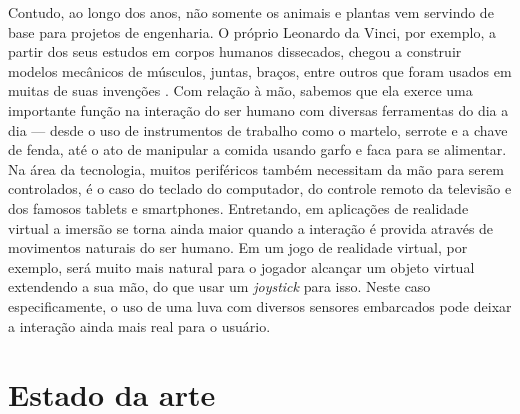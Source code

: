 \documentclass[
	12pt,				%
	openright,			%
	oneside,			%
	a4paper,			%
	english,			%
	brazil				%
	]{abntex2}
\begin{document}
		Contudo, ao longo dos anos, não somente os animais e plantas vem servindo de base para projetos de engenharia. O próprio Leonardo da Vinci, por exemplo, a partir dos seus estudos em corpos humanos dissecados, chegou a construir modelos mecânicos de músculos, juntas, braços, entre outros que foram usados em muitas de suas invenções \cite{rosheim2006leonardo}. Com relação à mão, sabemos que ela exerce uma importante função na interação do ser humano com diversas ferramentas do dia a dia --- desde o uso de instrumentos de trabalho como o martelo, serrote e a chave de fenda, até o ato de manipular a comida usando garfo e faca para se alimentar. Na área da tecnologia, muitos periféricos também necessitam da mão para serem controlados, é o caso do teclado do computador, do controle remoto da televisão e dos famosos tablets e smartphones.	Entretando, em aplicações de realidade virtual a imersão se torna ainda maior quando a interação é provida através de movimentos naturais do ser humano. Em um jogo de realidade virtual, por exemplo, será muito mais natural para o jogador alcançar um objeto virtual extendendo a sua mão, do que usar um \textit{joystick} para isso. Neste caso especificamente, o uso de uma luva com diversos sensores embarcados pode deixar a interação ainda mais real para o usuário. 
	

		\section{Estado da arte}

\end{document}
